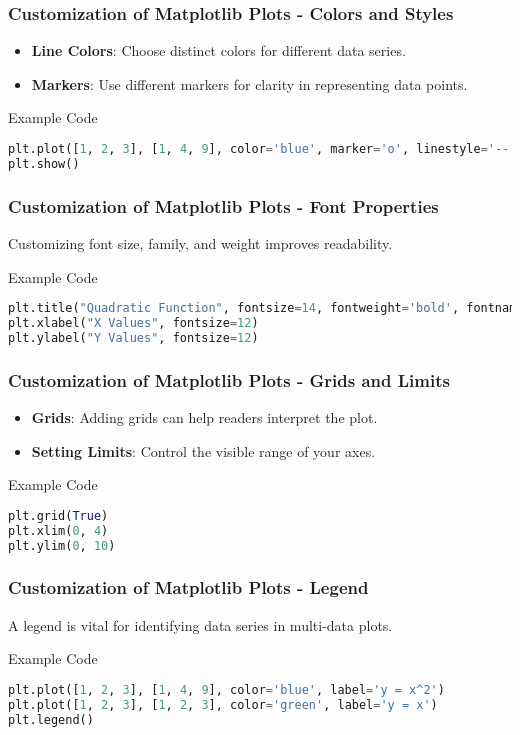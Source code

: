 \documentclass[aspectratio=169]{beamer}
\begin{document}
\begin{frame}[fragile]
    \frametitle{Customization of Matplotlib Plots - Colors and Styles}
    \begin{itemize}
        \item \textbf{Line Colors}: Choose distinct colors for different data series.
        \item \textbf{Markers}: Use different markers for clarity in representing data points.
    \end{itemize}
    \begin{block}{Example Code}
    \begin{lstlisting}[language=Python]
plt.plot([1, 2, 3], [1, 4, 9], color='blue', marker='o', linestyle='--')
plt.show()
    \end{lstlisting}
    \end{block}
\end{frame}

\begin{frame}[fragile]
    \frametitle{Customization of Matplotlib Plots - Font Properties}
    Customizing font size, family, and weight improves readability.
    \begin{block}{Example Code}
    \begin{lstlisting}[language=Python]
plt.title("Quadratic Function", fontsize=14, fontweight='bold', fontname='Comic Sans MS')
plt.xlabel("X Values", fontsize=12)
plt.ylabel("Y Values", fontsize=12)
    \end{lstlisting}
    \end{block}
\end{frame}

\begin{frame}[fragile]
    \frametitle{Customization of Matplotlib Plots - Grids and Limits}
    \begin{itemize}
        \item \textbf{Grids}: Adding grids can help readers interpret the plot.
        \item \textbf{Setting Limits}: Control the visible range of your axes.
    \end{itemize}
    \begin{block}{Example Code}
    \begin{lstlisting}[language=Python]
plt.grid(True)
plt.xlim(0, 4)
plt.ylim(0, 10)
    \end{lstlisting}
    \end{block}
\end{frame}

\begin{frame}[fragile]
    \frametitle{Customization of Matplotlib Plots - Legend}
    A legend is vital for identifying data series in multi-data plots.
    \begin{block}{Example Code}
    \begin{lstlisting}[language=Python]
plt.plot([1, 2, 3], [1, 4, 9], color='blue', label='y = x^2')
plt.plot([1, 2, 3], [1, 2, 3], color='green', label='y = x')
plt.legend()
    \end{lstlisting}
    \end{block}
\end{frame}
\end{document}
